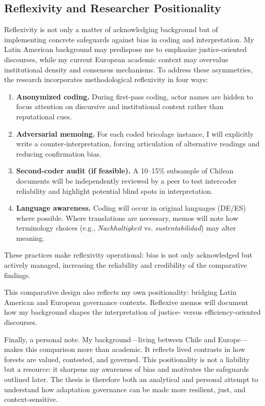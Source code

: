 \subsection*{Reflexivity and Researcher Positionality}

Reflexivity is not only a matter of acknowledging background but of implementing 
concrete safeguards against bias in coding and interpretation. My Latin American 
background may predispose me to emphasize justice-oriented discourses, while my 
current European academic context may overvalue institutional density and 
consensus mechanisms. To address these asymmetries, the research incorporates 
methodological reflexivity in four ways:

\begin{enumerate}
    \item \textbf{Anonymized coding.} During first-pass coding, actor names are 
    hidden to focus attention on discursive and institutional content rather than 
    reputational cues.

    \item \textbf{Adversarial memoing.} For each coded bricolage instance, I will 
    explicitly write a counter-interpretation, forcing articulation of alternative 
    readings and reducing confirmation bias.

    \item \textbf{Second-coder audit (if feasible).} A 10--15\% subsample of Chilean 
    documents will be independently reviewed by a peer to test intercoder reliability 
    and highlight potential blind spots in interpretation.

    \item \textbf{Language awareness.} Coding will occur in original languages (DE/ES) 
    where possible. Where translations are necessary, memos will note how terminology 
    choices (e.g., \emph{Nachhaltigkeit} vs. \emph{sustentabilidad}) may alter meaning.
\end{enumerate}

These practices make reflexivity operational: bias is not only acknowledged but actively 
managed, increasing the reliability and credibility of the comparative findings.

This comparative design also reflects my own positionality: bridging Latin American and 
European governance contexts. Reflexive memos will document how my background shapes the 
interpretation of justice- versus efficiency-oriented discourses.

Finally, a personal note. My background---living between Chile and Europe---makes this 
comparison more than academic. It reflects lived contrasts in how forests are valued, 
contested, and governed. This positionality is not a liability but a resource: it 
sharpens my awareness of bias and motivates the safeguards outlined later. The thesis 
is therefore both an analytical and personal attempt to understand how adaptation 
governance can be made more resilient, just, and context-sensitive.